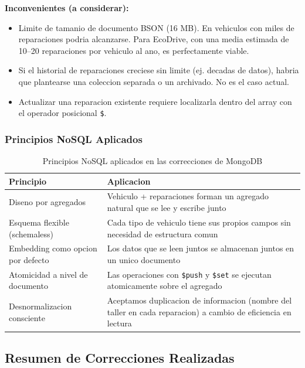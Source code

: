 \textbf{Inconvenientes (a considerar):}
\begin{itemize}
    \item Limite de tamanio de documento BSON (16 MB). En vehiculos con miles de reparaciones podria alcanzarse. Para EcoDrive, con una media estimada de 10--20 reparaciones por vehiculo al ano, es perfectamente viable.
    \item Si el historial de reparaciones creciese sin limite (ej. decadas de datos), habria que plantearse una coleccion separada o un archivado. No es el caso actual.
    \item Actualizar una reparacion existente requiere localizarla dentro del array con el operador posicional \texttt{\$}.
\end{itemize}

\subsubsection{Principios NoSQL Aplicados}

\begin{table}[h]
\centering
\begin{tabular}{|l|p{10cm}|}
\hline
\textbf{Principio} & \textbf{Aplicacion} \\
\hline
Diseno por agregados & Vehiculo + reparaciones forman un agregado natural que se lee y escribe junto \\
\hline
Esquema flexible (schemaless) & Cada tipo de vehiculo tiene sus propios campos sin necesidad de estructura comun \\
\hline
Embedding como opcion por defecto & Los datos que se leen juntos se almacenan juntos en un unico documento \\
\hline
Atomicidad a nivel de documento & Las operaciones con \texttt{\$push} y \texttt{\$set} se ejecutan atomicamente sobre el agregado \\
\hline
Desnormalizacion consciente & Aceptamos duplicacion de informacion (nombre del taller en cada reparacion) a cambio de eficiencia en lectura \\
\hline
\end{tabular}
\caption{Principios NoSQL aplicados en las correcciones de MongoDB}
\end{table}

\newpage

\subsection{Resumen de Correcciones Realizadas}

